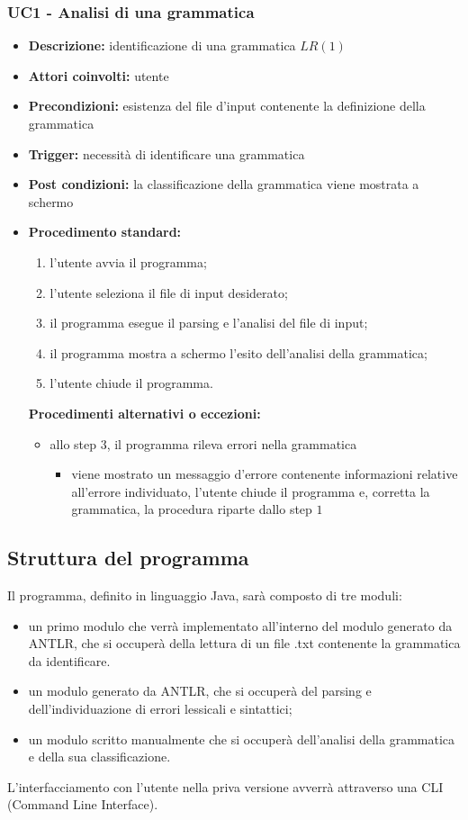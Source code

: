 \documentclass[12pt]{article}
\begin{document}
\subsubsection{UC1 - Analisi di una grammatica}
\begin{itemize}[label=]
\item \textbf{Descrizione:} identificazione di una grammatica $LR\left( 1 \right)$
\item \textbf{Attori coinvolti:} utente
\item \textbf{Precondizioni:} esistenza del file d'input contenente la definizione della grammatica
\item \textbf{Trigger:} necessità di identificare una grammatica
\item \textbf{Post condizioni:} la classificazione della grammatica viene mostrata a schermo
\item \textbf{Procedimento standard:}
\begin{enumerate}[label=\arabic*.]
\item l'utente avvia il programma;
\item l'utente seleziona il file di input desiderato;
\item il programma esegue il parsing e l'analisi del file di input;
\item il programma mostra a schermo l'esito dell'analisi della grammatica;
\item l'utente chiude il programma.
\end{enumerate}
\textbf{Procedimenti alternativi o eccezioni:}
\begin{itemize}
\item allo step $3$, il programma rileva errori nella grammatica
\begin{itemize}[label=]
\item viene mostrato un messaggio d'errore contenente informazioni relative all'errore individuato, l'utente chiude il programma e, corretta la grammatica, la procedura riparte dallo step $1$
\end{itemize}
\end{itemize}
\end{itemize}
\pagebreak

\subsection{Struttura del programma}
Il programma, definito in linguaggio Java, sarà composto di tre moduli:
\begin{itemize}
\item un primo modulo che verrà implementato all'interno del modulo generato da ANTLR, che si occuperà della lettura di un file .txt contenente la grammatica da identificare.
\item un modulo generato da ANTLR, che si occuperà del parsing e dell'individuazione di errori lessicali e sintattici;
\item un modulo scritto manualmente che si occuperà dell'analisi della grammatica e della sua classificazione.
\end{itemize}
L'interfacciamento con l'utente nella priva versione avverrà attraverso una CLI (Command Line Interface).
\end{document}
